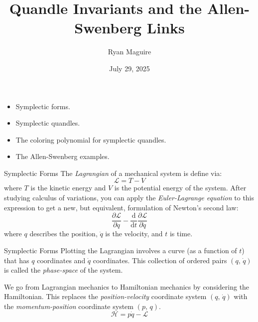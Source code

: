 \documentclass{beamer}
\title{Quandle Invariants and the Allen-Swenberg Links}
\author{Ryan Maguire}
\date{July 29, 2025}
\begin{document}
    \maketitle
    \begin{frame}
        \begin{itemize}
            \item
                Symplectic forms.
            \item
                Symplectic quandles.
            \item
                The coloring polynomial for symplectic quandles.
            \item
                The Allen-Swenberg examples.
        \end{itemize}
    \end{frame}
    \begin{frame}{Symplectic Forms}
        The \textit{Lagrangian} of a mechanical system is define via:
        \[
            \mathcal{L}=T-V
        \]
        where $T$ is the kinetic energy and $V$ is the potential energy of the
        system. After studying calculus of variations, you can apply the
        \textit{Euler-Lagrange equation} to this expression to get a new, but
        equivalent, formulation of Newton's second law:
        \[
            \frac{\partial\mathcal{L}}{\partial{q}}
            -\frac{\textrm{d}}{\textrm{d}t}
            \frac{\partial\mathcal{L}}{\partial\dot{q}}
        \]
        where $q$ describes the position, $\dot{q}$ is the velocity,
        and $t$ is time.
    \end{frame}
    \begin{frame}{Symplectic Forms}
        Plotting the Lagrangian involves a curve (as a function of $t$)
        that has $q$ coordinates and $\dot{q}$ coordinates. This collection of
        ordered pairs $(q,\,\dot{q})$ is called the \textit{phase-space} of the
        system.
        \par\hfill\par
        We go from Lagrangian mechanics to Hamiltonian mechanics by considering
        the Hamiltonian. This replaces the \textit{position-velocity} coordinate
        system $(q,\,\dot{q})$ with the \textit{momentum-position} coordinate
        system $(p,\,q)$.
        \[
            \mathcal{H}
            =p\dot{q}-\mathcal{L}
        \]
    \end{frame}
\end{document}

